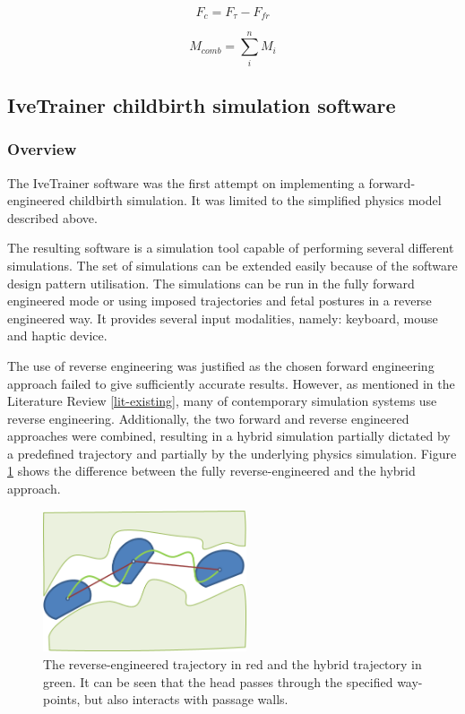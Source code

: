 \begin{equation}
\label{findingFc}
F_c = F_{\tau} - F_{fr}
\end{equation}

\begin{equation}
\label{combineMoments}
M_{comb}=\sum_{i}^{n}M_{i}
\end{equation}

\subsection{IveTrainer childbirth simulation software}

\subsubsection{Overview}

The IveTrainer software was the first attempt on implementing a forward-engineered childbirth simulation. It was limited to the simplified physics model described above.

The resulting software is a simulation tool capable of performing several different simulations. The set of simulations can be extended easily because of the software design pattern utilisation. The simulations can be run in the fully forward engineered mode or using imposed trajectories and fetal postures in a reverse engineered way. It provides several input modalities, namely: keyboard, mouse and haptic device.

The use of reverse engineering was justified as the chosen forward engineering approach failed to give sufficiently accurate results. However, as mentioned in the Literature Review \ref{lit-existing}, many of contemporary simulation systems use reverse engineering. Additionally, the two forward and reverse engineered approaches were combined, resulting in a hybrid simulation partially dictated by a predefined trajectory and partially by the underlying physics simulation. Figure \ref{hybridFig} shows the difference between the fully reverse-engineered and the hybrid approach.

\begin{figure}
  \centering
    \includegraphics[width=60mm]{sections/methodology/images/basic/hybrid-trajectory.png}
  \caption[The reverse-engineered trajectory in red and the hybrid trajectory in green.]{\label{hybridFig} The reverse-engineered trajectory in red and the hybrid trajectory in green. It can be seen that the head passes through the specified way-points, but also interacts with passage walls.}
\end{figure}

